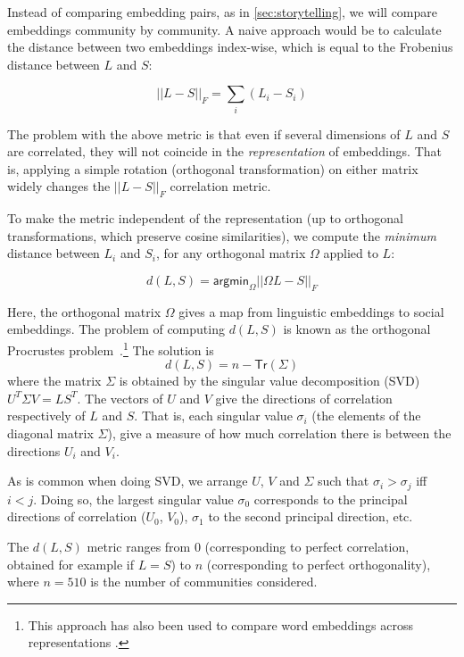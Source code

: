 \documentclass[11pt]{article}
\begin{document}

Instead of comparing embedding pairs, as in \cref{sec:storytelling}, 
we will compare embeddings community by community.
A naive approach would be to 
calculate the distance between two embeddings index-wise, which is
equal to the Frobenius distance between \(L\) and \(S\):

\[||L-S||_F = \sum_i (L_i - S_i)\]

The problem with the above metric is that even if several dimensions
of \(L\) and \(S\) are correlated, they will not coincide in the
\emph{representation} of embeddings. That is, applying a simple
rotation (orthogonal transformation) on either matrix widely changes
the \(||L-S||_F\) correlation metric.


To make the metric independent of the representation (up to orthogonal
transformations, which preserve cosine similarities), we compute the
\emph{minimum} distance between \(L_i\) and \(S_i\), for any
orthogonal matrix \(\Omega\) applied to \(L\):

\[d(L,S) = \mathsf{argmin}_\Omega ||ΩL-S||_F\]

Here, the orthogonal matrix \(Ω\) gives a map from linguistic embeddings to social embeddings.
The problem of computing \(d(L,S)\) is known as the orthogonal Procrustes problem~\citep{Gower2004}.\footnote{
This approach has also been used to compare word embeddings across representations \citep[e.g.,][]{Hamilton2016a}.}
The solution is
\[d(L,S) = n - \mathsf {Tr} (Σ)\] where the matrix \(Σ\) is obtained by the singular value
decomposition (SVD) \(U^TΣV = LS^T\). The vectors of \(U\) and \(V\) give
the directions of correlation respectively of \(L\) and \(S\). That is, each
singular value \(\sigma_i\) (the elements of the diagonal matrix \(Σ\)), give a measure of how much
correlation there is between the directions \(U_i\) and \(V_i\).

As is common when doing SVD, we arrange \(U\), \(V\) and \(Σ\) such
that \(σ_i > σ_j\) iff \(i < j\). Doing so, the largest singular value
\(σ_0\) corresponds to the principal directions of correlation
(\(U_0\), \(V_0\)), \(σ_1\) to the second principal direction, etc.

The \(d(L,S)\) metric ranges from \(0\) (corresponding to perfect
correlation, obtained for example if \(L=S\)) to \(n\) (corresponding
to perfect orthogonality), where $n=510$ is the number of communities
considered.
\end{document}
